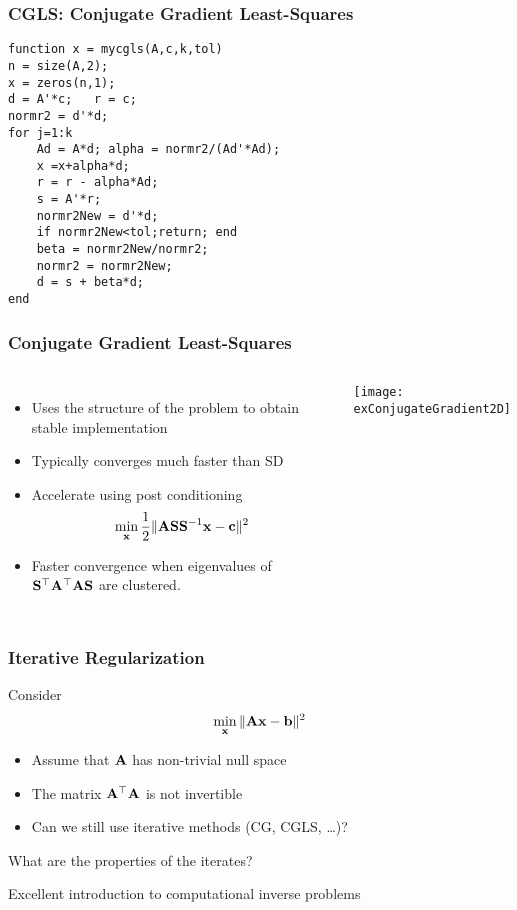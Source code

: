 \documentclass[12pt,fleqn,handout]{beamer}
\begin{document}
\begin{frame}[fragile]
	\frametitle{CGLS: Conjugate Gradient Least-Squares}
\begin{verbatim}
function x = mycgls(A,c,k,tol)
n = size(A,2);
x = zeros(n,1);
d = A'*c;   r = c;
normr2 = d'*d;
for j=1:k
    Ad = A*d; alpha = normr2/(Ad'*Ad); 
    x =x+alpha*d;
    r = r - alpha*Ad;
    s = A'*r;
    normr2New = d'*d;
    if normr2New<tol;return; end
    beta = normr2New/normr2;
    normr2 = normr2New;
    d = s + beta*d;
end
\end{verbatim}



\end{frame}

\begin{frame}
	\frametitle{Conjugate Gradient Least-Squares}
\begin{columns}
	\begin{itemize}
	\item
	Uses the structure of the problem to obtain stable implementation
	\item
	Typically converges much faster than SD
	\item 
	Accelerate using post conditioning
	$$ \min_{\bf x} {\frac 12} \|{\bf A} {\bf S} {\bf S}^{-1} {\bf x} - {\bf c}\|^2$$
	\item 
	Faster convergence when eigenvalues of ${\bf S}^{\top} {\bf A}^{\top} {\bf A} {\bf S}$ are clustered.
	\end{itemize}
	
		
	\texttt{[image: exConjugateGradient2D]}
\end{columns}
\end{frame}

\begin{frame}
	\frametitle{Iterative Regularization}

Consider
$$
	\min_{\bf x} \| {\bf A} {\bf x} - {\bf b} \|^2
$$
\begin{itemize}
\item
Assume that ${\bf A}$ has non-trivial null space
\item The matrix ${\bf A}^{\top}{\bf A}$ is not invertible
\item Can we still use iterative methods (CG, CGLS, \ldots)?
\end{itemize}

\bigskip

What are the properties of the iterates? 

\bigskip

Excellent introduction to computational inverse problems~\cite{Hansen1998,Vogel2002,Hansen2010}

\end{frame}
\end{document}
